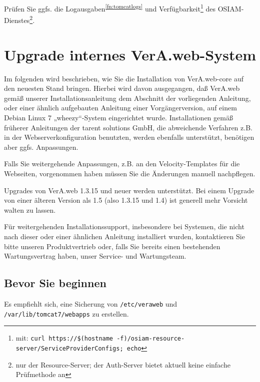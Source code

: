 Prüfen Sie ggfs. die Logausgaben\Hair\textsuperscript{\ref{fn:tomcatlogs}}
und Verfügbarkeit\Hair\footnote{\label{fn:osiamcheck}mit:
\texttt{curl https://\$(hostname -f)/osiam-resource-server/ServiceProviderConfigs; echo}%
} des OSIAM-Dienstes\Hair\footnote{\label{fn:osiamsvcchk}nur der
Resource-Server; der Auth-Server bietet aktuell keine einfache Prüfmethode an}.

\fi%

\section{Upgrade internes VerA.web-System}\label{sec:upgrade-int}

Im folgenden wird beschrieben, wie Sie die Installation von
VerA.web-core auf den neuesten Stand bringen.
Hierbei wird davon ausgegangen, daß VerA.web gemäß
 \ifupgradeanleitung
  unserer Installationsanleitung
 \else%
  dem Abschnitt  der vorliegenden Anleitung,
  oder einer ähnlich aufgebauten Anleitung einer Vorgängerversion,
 \fi%
auf einem Debian Linux 7 „wheezy“-System eingerichtet wurde.
Installationen gemäß früherer Anleitungen der tarent solutions GmbH,
die abweichende Verfahren z.B. in der Webserverkonfiguration benutzten,
werden ebenfalls unterstützt, benötigen aber ggfs. Anpassungen.

Falls Sie weitergehende Anpassungen, z.B. an den Velocity-Templates
für die Webseiten, vorgenommen haben müssen Sie die Änderungen
manuell nachpflegen.

\ifvwconfigsinetcalready\else%
Upgrades von VerA.web 1.3.15 und neuer werden unterstützt. Bei einem
Upgrade von einer älteren Version als 1.5 (also 1.3.15 und 1.4) ist
generell mehr Vorsicht walten zu lassen.
\fi%

Für weitergehenden Installationssupport, insbesondere bei Systemen,
die nicht nach dieser oder einer ähnlichen Anleitung installiert
wurden, kontaktieren Sie bitte unseren Produktvertrieb oder, falls
Sie bereits einen bestehenden Wartungsvertrag haben, unser Service-
und Wartungsteam.

\subsection{Bevor Sie beginnen}\label{subsec:upgrade-core-pre}

Es empfiehlt sich, eine Sicherung von \texttt{/etc/veraweb} und
\texttt{/var/lib/tomcat7/webapps} zu erstellen.


